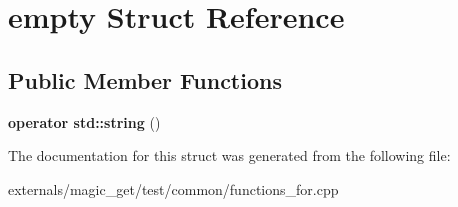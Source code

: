 \hypertarget{structempty}{}\section{empty Struct Reference}
\label{structempty}
\subsection*{Public Member Functions}
\begin{DoxyCompactItemize}
\item 
\mbox{\label{structempty_ae8410e04d4565f35550918e4c5c9eb75}} 
{\bfseries operator std\+::string} ()
\end{DoxyCompactItemize}


The documentation for this struct was generated from the following file\+:\begin{DoxyCompactItemize}
\item 
externals/magic\+\_\+get/test/common/functions\+\_\+for.\+cpp\end{DoxyCompactItemize}
